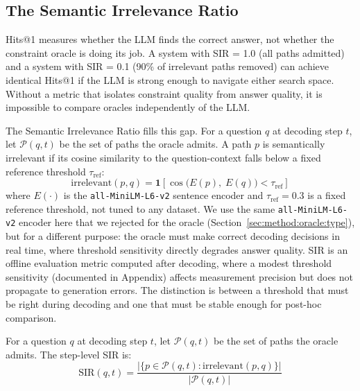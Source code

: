\subsection{The Semantic Irrelevance Ratio}
\label{sec:method:sir}

Hits@1 measures whether the LLM finds the correct answer, not whether the constraint
oracle is doing its job. A system with SIR = 1.0 (all paths admitted)
and a system with SIR = 0.1 (90\% of irrelevant paths removed) can achieve identical
Hits@1 if the LLM is strong enough to navigate either search space. Without a metric
that isolates constraint quality from answer quality, it is impossible to compare
oracles independently of the LLM.

The Semantic Irrelevance Ratio fills this gap. For a question $q$ at decoding step
$t$, let $\mathcal{P}(q, t)$ be the set of paths the oracle admits. A path $p$ is
semantically irrelevant if its cosine similarity to the question-context falls below a
fixed reference threshold $\tau_{\text{ref}}$:
\begin{equation}
  \text{irrelevant}(p, q) = \mathbf{1}\!\left[
    \cos\!\bigl(E(p),\; E(q)\bigr) < \tau_{\text{ref}}
  \right]
  \label{eq:irrelevant}
\end{equation}
where $E(\cdot)$ is the \texttt{all-MiniLM-L6-v2} sentence encoder and
$\tau_{\text{ref}} = 0.3$ is a fixed reference threshold, not tuned to any dataset. We
use the same \texttt{all-MiniLM-L6-v2} encoder here that we rejected for the oracle
(Section~\ref{sec:method:oracle:type}), but for a different purpose: the oracle must
make correct decoding decisions in real time, where threshold sensitivity directly
degrades answer quality. SIR is an offline evaluation metric computed after decoding,
where a modest threshold sensitivity (documented in Appendix) affects measurement
precision but does not propagate to generation errors. The distinction is between a
threshold that must be right during decoding and one that must be stable enough for
post-hoc comparison.

\begin{definition}
\label{def:sir}
For a question $q$ at decoding step $t$, let $\mathcal{P}(q, t)$ be the set of paths
the oracle admits. The step-level SIR is:
\begin{equation}
  \text{SIR}(q, t) = \frac{|\{p \in \mathcal{P}(q,t) :
  \text{irrelevant}(p, q)\}|}{|\mathcal{P}(q, t)|}
  \label{eq:sir_step}
\end{equation}
\end{definition}

